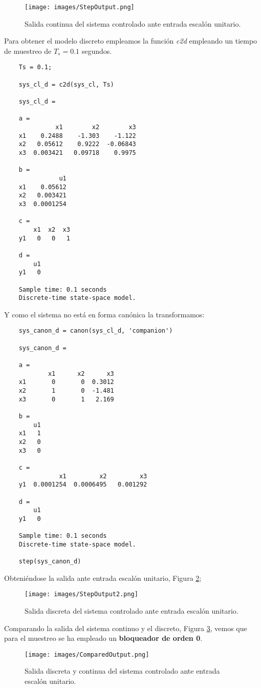 \documentclass[a4paper, fontsize=11pt]{scrartcl} %
\numberwithin{equation}{section} %
\numberwithin{figure}{section} %
\numberwithin{table}{section} %
\begin{document}
	\begin{figure}[h!]
		\centering
		\texttt{[image: images/StepOutput.png]}
		\caption{Salida continua del sistema controlado ante entrada escalón unitario.}
		\label{Conitunous Output}
	\end{figure}
	\FloatBarrier
	
	Para obtener el modelo discreto empleamos la función \textit{c2d} empleando un tiempo de muestreo de $T_s = 0.1$ segundos.\\
	
	\begin{lstlisting}
	Ts = 0.1;
	
	sys_cl_d = c2d(sys_cl, Ts)
	
	sys_cl_d =
	
	a = 
	          x1        x2        x3
	x1    0.2488    -1.303    -1.122
	x2   0.05612    0.9222  -0.06843
	x3  0.003421   0.09718    0.9975
	
	b = 
	           u1
	x1    0.05612
	x2   0.003421
	x3  0.0001254
	
	c = 
	    x1  x2  x3
	y1   0   0   1
	
	d = 
	    u1
	y1   0
	
	Sample time: 0.1 seconds
	Discrete-time state-space model.
	\end{lstlisting}
	
	Y como el sistema no está en forma canónica la transformamos:
	
	\begin{lstlisting}
	sys_canon_d = canon(sys_cl_d, 'companion')
	
	sys_canon_d =
	
	a = 
	        x1      x2      x3
	x1       0       0  0.3012
	x2       1       0  -1.481
	x3       0       1   2.169
	
	b = 
	    u1
	x1   1
	x2   0
	x3   0
	
	c = 
	           x1         x2         x3
	y1  0.0001254  0.0006495   0.001292
	
	d = 
	    u1
	y1   0
	
	Sample time: 0.1 seconds
	Discrete-time state-space model.
	
	step(sys_canon_d)
	\end{lstlisting}
	
	Obteniéndose la salida ante entrada escalón unitario, Figura \ref{Discrete Output};
	
	\begin{figure}[h!]
		\centering
		\texttt{[image: images/StepOutput2.png]}
		\caption{Salida discreta del sistema controlado ante entrada escalón unitario.}
		\label{Discrete Output}
	\end{figure}
	\FloatBarrier
	
	Comparando la salida del sistema continuo y el discreto, Figura \ref{Compared Output}, vemos que para el muestreo se ha empleado un \textbf{bloqueador de orden 0}.
	
	\begin{figure}[h!]
		\centering
		\texttt{[image: images/ComparedOutput.png]}
		\caption{Salida discreta y continua del sistema controlado ante entrada escalón unitario.}
		\label{Compared Output}
	\end{figure}
	\FloatBarrier
	
\end{document}
